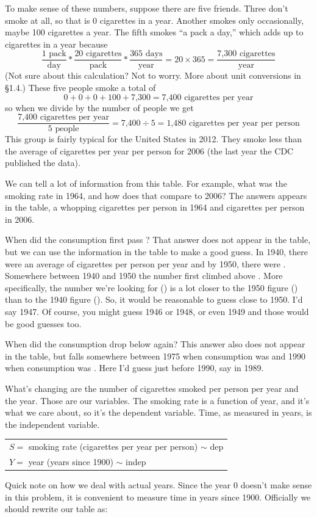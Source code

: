 To make sense of these numbers, suppose there are five friends.  Three don't smoke at all, so that is 0 cigarettes in a year.  Another smokes only occasionally, maybe 100 cigarettes a year.  The fifth smokes ``a pack a day,''  which adds up to  cigarettes in a year because
$$\frac{1\text{ pack}}{\text{day}} \ast \frac{20\text{ cigarettes}}{\text{pack}} 
\ast \frac{365 \text{ days}}{\text{year}} 
=20 \times 365
= \frac{\text{7,300 cigarettes}}{\text{year}} $$
(Not sure about this calculation?  Not to worry.  More about unit conversions in \S1.4.) %
These five people smoke a total of $$0+0+0+100+\text{7,300}=\text{7,400 cigarettes per year}$$
so when we divide by the number of people we get
$$\frac{\text{7,400 cigarettes per year}}{5 \text{ people}} = \text{7,400} \div 5 = \text{1,480 cigarettes per year per person}$$
This group is fairly typical for the United States in 2012.  They smoke less than the average of  cigarettes per year per person for 2006 (the last year the CDC published the data). 

We can tell a lot of information from this table.  For example, what was the smoking rate in 1964, and how does that compare to 2006?  The answers appears in the table, a whopping  cigarettes per person in 1964 and  cigarettes per person in 2006.

When did the consumption first pass ?  That answer does not appear in the table, but we can use the information in the table to make a good guess.  In 1940, there were an average of  cigarettes per person per year and by 1950, there were .  Somewhere between 1940 and 1950 the number first climbed above .  More specifically, the number we're looking for () is a lot closer to the 1950 figure () than to the 1940 figure ().  So, it would be reasonable to guess close to 1950.  I'd say 1947.  Of course, you might guess 1946 or 1948, or even 1949 and those would be good guesses too.  

When did the consumption drop below  again?  This answer also does not appear in the table, but falls somewhere between 1975 when consumption was  and 1990 when consumption was   .  Here I'd guess just before 1990, say in 1989.   

What's changing are the number of cigarettes smoked per person per year and the year.  Those are our variables.  The smoking rate is a function of year, and it's what we care about, so it's the dependent variable.  Time, as measured in years, is the independent variable.   
\begin{center}
\begin{tabular} {l}
$S=$ smoking rate (cigarettes per year per person) $\sim$ dep \\
$Y= $ year (years since 1900) $\sim$ indep \\ 
\end{tabular}
\end{center}
Quick note on how we deal with actual years.  Since the year 0 doesn't make sense in this problem, it is convenient to measure time in years since 1900. Officially we should rewrite our table as:

